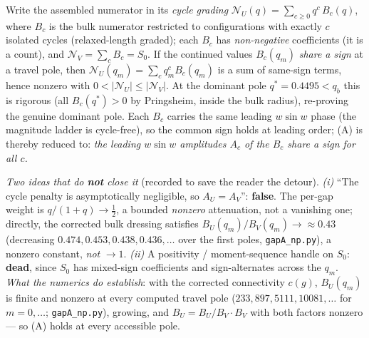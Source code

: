 \begin{remark}\label{rem:cyclegrade}
Write the assembled numerator in its \emph{cycle grading}
$\mathcal N_U(q)=\sum_{c\ge0}q^{c}\,B_c(q)$, where $B_c$ is the bulk numerator restricted to
configurations with exactly $c$ isolated cycles (relaxed-length graded); each $B_c$ has
\emph{non-negative} coefficients (it is a count), and $\mathcal N_V=\sum_c B_c=S_0$. If the
continued values $B_c(q_m)$ \emph{share a sign} at a travel pole, then
$\mathcal N_U(q_m)=\sum_c q_m^{c}B_c(q_m)$ is a sum of same-sign terms, hence nonzero with
$0<|\mathcal N_U|\le|\mathcal N_V|$. At the dominant pole $q^{\ast}=0.4495<q_b$ this is
rigorous (all $B_c(q^{\ast})>0$ by Pringsheim, inside the bulk radius), re-proving the genuine
dominant pole. Each $B_c$ carries the same leading $w\sin w$ phase (the magnitude ladder is
cycle-free), so the common sign holds at leading order; (A) is thereby reduced to:
\emph{the leading $w\sin w$ amplitudes $A_c$ of the $B_c$ share a sign for all $c$.}

\emph{Two ideas that do \textbf{not} close it} (recorded to save the reader the detour).
\emph{(i)} ``The cycle penalty is asymptotically negligible, so $A_U=A_V$'': \textbf{false}.
The per-gap weight is $q/(1+q)\to\tfrac12$, a bounded \emph{nonzero} attenuation, not a
vanishing one; directly, the corrected bulk dressing satisfies
$B_U(q_m)/B_V(q_m)\to\approx0.43$ (decreasing $0.474,0.453,0.438,0.436,\dots$ over the first
poles, \texttt{gapA\_np.py}), a nonzero constant, \emph{not} $\to1$. \emph{(ii)} A positivity
/ moment-sequence handle on $S_0$: \textbf{dead}, since $S_0$ has mixed-sign coefficients and
sign-alternates across the $q_m$. \emph{What the numerics do establish}: with the corrected
connectivity $c(g)$, $B_U(q_m)$ is finite and nonzero at every computed travel pole
($233,897,5111,10081,\dots$ for $m=0,\dots$; \texttt{gapA\_np.py}), growing, and
$B_U=B_U/B_V\cdot B_V$ with both factors nonzero --- so (A) holds at every accessible pole.


\end{remark}
